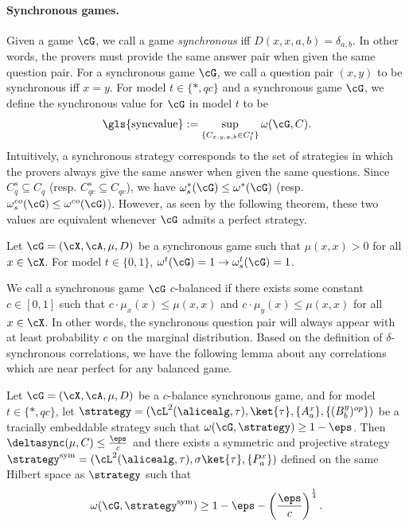 \paragraph{Synchronous games. }Given a game $\cG$, we call a game \textit{synchronous} iff $D(x,x, a,b) = \delta_{a,b}$. In other words, the provers must provide the same answer pair when given the same question pair. For a synchronous game $\cG$, we call a question pair $(x,y)$ to be synchronous iff $x = y$. For model $t \in \{*, qc\}$ and a synchronous game $\cG$, we define the synchronous value for $\cG$ in model $t$ to be
\begin{equation*}
	\text{\gls{syncvalue}}:= \sup_{\{C_{x,y,a,b} \in C_t^s \}} \omega(\cG, C).
\end{equation*}
Intuitively, a synchronous strategy corresponds to the set of strategies in which the provers always give the same answer when given the same questions. Since $C_{q}^s \subseteq C_{q}$ (resp. $C_{qc}^s \subseteq C_{qc}$), we have $\omega^{*}_s(\cG) \leq \omega^{*} (\cG)$  (resp. $\omega^{co}_s(\cG) \leq \omega^{co} (\cG)$). However, as seen by the following theorem, these two values are equivalent whenever $\cG$ admits a perfect strategy. 
\begin{theorem} \label{thm:syncvaluepreserve}
	Let $\cG = (\cX, \cA, \mu, D)$ be a synchronous game such that $\mu(x,x) > 0$ for all $x \in \cX$. For model $t \in \{0,1\}$, $\omega^{t}(\cG) = 1 \rightarrow \omega^{t}_s(\cG) =1$.
\end{theorem}
We call a synchronous game $\cG$ $c$-balanced if there exists some constant $c \in [0,1]$ such that $c \cdot \mu_x(x) \leq \mu(x,x)$ and $c \cdot \mu_y(x) \leq \mu(x,x)$ for all $x \in \cX$. In other words, the synchronous question pair will always appear with at least probability $c$ on the marginal distribution. Based on the definition of $\delta$-synchronous correlations, we have the following lemma about any correlations which are near perfect for any balanced game. 
\begin{lemma} \label{lem:balancedperfecttoalmostsync}
	Let $\cG = (\cX, \cA, \mu, D)$ be a $c$-balance synchronous game, and for model $t \in \{*, qc\}$,  let $\strategy= (\cL^2(\alicealg, \tau), \ket{\tau}, \\ \{A_a^x \}, \{(B_b^y)^{op}\})$ be a tracially embeddable strategy such that $\omega(\cG, \strategy) \geq 1 - \eps$. Then $\deltasync(\mu, C) \leq \frac{\eps}{c}$ and there exists a symmetric and projective strategy $\strategy^{\text{sym}} = ( \cL^2(\alicealg, \tau), \sigma \ket{\tau},\{ P_{a}^x \})$ defined on the same Hilbert space as $\strategy$ such that 
	\begin{equation*}
		\omega(\cG, \strategy^{\text{sym}}) \geq 1 - \eps - \left(\frac{\eps}{c} \right)^{\frac{1}{4}}. 
	\end{equation*}
\end{lemma}
